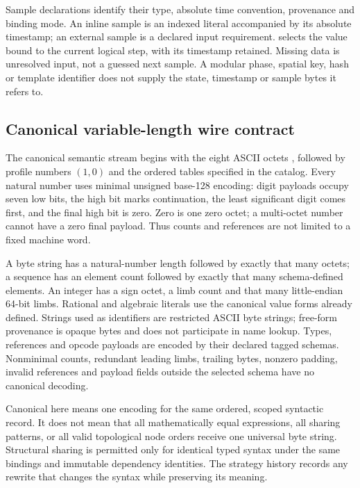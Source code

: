 Sample declarations identify their type, absolute time convention, provenance
and binding mode. An inline sample is an indexed literal accompanied by its
absolute timestamp; an external sample is a declared input requirement.
 selects the value bound to the current logical step, with its
timestamp retained. Missing data is unresolved input, not a guessed next sample.
A modular phase, spatial key, hash or template identifier does not supply the
state, timestamp or sample bytes it refers to.

\subsection{Canonical variable-length wire contract}
The canonical semantic stream begins with the eight ASCII octets
, followed by profile numbers $(1,0)$ and the ordered tables
specified in the catalog. Every natural number uses minimal unsigned base-128
encoding: digit payloads occupy seven low bits, the high bit marks continuation,
the least significant digit comes first, and the final high bit is zero.
Zero is one zero octet; a multi-octet number cannot have a zero final payload.
Thus counts and references are not limited to a fixed machine word.

A byte string has a natural-number length followed by exactly that many octets;
a sequence has an element count followed by exactly that many schema-defined
elements. An integer has a sign octet, a limb count and that many little-endian
64-bit limbs. Rational and algebraic literals use the canonical value forms
already defined. Strings used as identifiers are restricted ASCII byte strings;
free-form provenance is opaque bytes and does not participate in name lookup.
Types, references and opcode payloads are encoded by their declared tagged
schemas. Nonminimal counts, redundant leading limbs, trailing bytes, nonzero
padding, invalid references and payload fields outside the selected schema have
no canonical decoding.

Canonical here means one encoding for the same ordered, scoped syntactic
record. It does not mean that all mathematically equal expressions, all sharing
patterns, or all valid topological node orders receive one universal byte string.
Structural sharing is permitted only for identical typed syntax under the same
bindings and immutable dependency identities. The strategy history records any
rewrite that changes the syntax while preserving its meaning.

